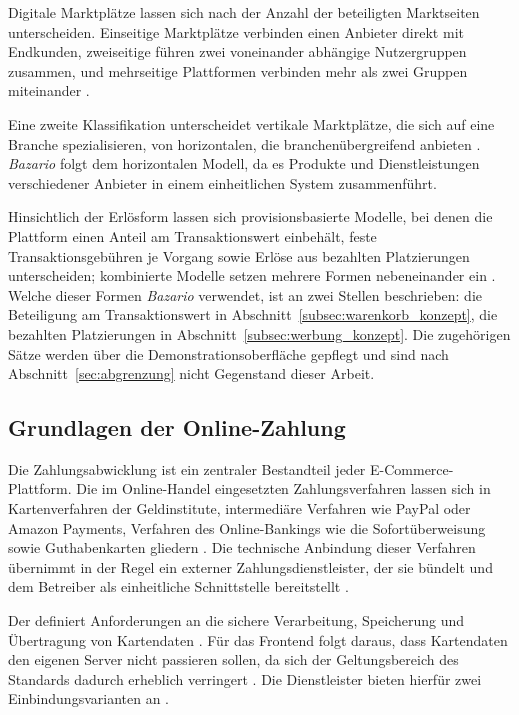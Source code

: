 Digitale Marktplätze lassen sich nach der Anzahl der beteiligten
Marktseiten unterscheiden. Einseitige Marktplätze verbinden einen
Anbieter direkt mit Endkunden, zweiseitige führen zwei voneinander
abhängige Nutzergruppen zusammen, und mehrseitige Plattformen
verbinden mehr als zwei Gruppen miteinander
\cite{heinemann_online_handel}.

Eine zweite Klassifikation unterscheidet vertikale Marktplätze, die
sich auf eine Branche spezialisieren, von horizontalen, die
branchenübergreifend anbieten \cite{taeuscher_platform_models}.
\textit{Bazario} folgt dem horizontalen Modell, da es Produkte und
Dienstleistungen verschiedener Anbieter in einem einheitlichen System
zusammenführt.

Hinsichtlich der Erlösform lassen sich provisionsbasierte Modelle, bei
denen die Plattform einen Anteil am Transaktionswert einbehält, feste
Transaktionsgebühren je Vorgang sowie Erlöse aus bezahlten
Platzierungen unterscheiden; kombinierte Modelle setzen mehrere
Formen nebeneinander ein \cite{taeuscher_platform_models,
heinemann_online_handel}. Welche dieser Formen \textit{Bazario}
verwendet, ist an zwei Stellen beschrieben: die Beteiligung am
Transaktionswert in Abschnitt~\ref{subsec:warenkorb_konzept}, die
bezahlten Platzierungen in Abschnitt~\ref{subsec:werbung_konzept}. Die zugehörigen Sätze werden über die Demonstrationsoberfläche
gepflegt und sind nach Abschnitt~\ref{sec:abgrenzung} nicht Gegenstand
dieser Arbeit.


\subsection{Grundlagen der Online-Zahlung}
\label{subsec:online-zahlung}

Die Zahlungsabwicklung ist ein zentraler Bestandteil jeder
E-Commerce-Plattform. Die im Online-Handel eingesetzten
Zahlungsverfahren lassen sich in Kartenverfahren der Geldinstitute,
intermediäre Verfahren wie PayPal oder Amazon Payments, Verfahren des
Online-Bankings wie die Sofortüberweisung sowie Guthabenkarten
gliedern \cite{heinemann_online_handel}. Die technische Anbindung
dieser Verfahren übernimmt in der Regel ein externer
Zahlungsdienstleister, der sie bündelt und dem Betreiber als
einheitliche Schnittstelle bereitstellt \cite{heinemann_online_handel}.

Der  definiert Anforderungen an die sichere
Verarbeitung, Speicherung und Übertragung von Kartendaten
\cite{pci_dss_401}. Für das Frontend folgt daraus, dass Kartendaten
den eigenen Server nicht passieren sollen, da sich der Geltungsbereich
des Standards dadurch erheblich verringert
\cite{stripe_security_guide}. Die Dienstleister bieten hierfür zwei
Einbindungsvarianten an \cite{stripe_elements_docs,
stripe_checkout_docs}.

